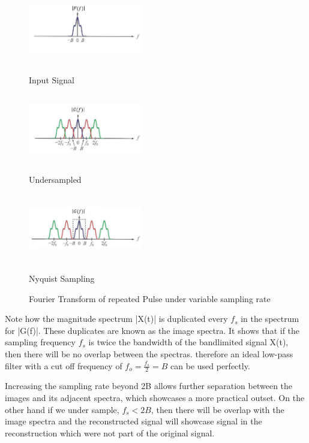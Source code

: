 \documentclass{article}
\begin{document}
\begin{figure}[!htb]
      \includegraphics[width=5cm, height=3cm]{figures/Orig_Sample_Singal_Single_Impulse.PNG}
      \caption{Input Signal}
    \endminipage\hfill
      \includegraphics[width=5cm, height=3cm]{figures/Undersampled.PNG}
      \caption{Undersampled}
    \endminipage\hfill
      \includegraphics[width=5cm, height=3cm]{figures/Orig_Nyquiest.PNG}
      \caption{Nyquist Sampling}
    \endminipage\hfill
    \caption{Fourier Transform of repeated Pulse under variable sampling rate}
    \label{fig:shannon}
\end{figure}

Note how the magnitude spectrum |X(t)| is duplicated every $ f_s $ in the spectrum for |G(f)|. These duplicates are known as the image spectra. It shows that if the sampling frequency $ f_s $ is twice the bandwidth of the bandlimited signal X(t), then there will be no overlap between the spectras. therefore an ideal low-pass filter with a cut off frequency of $ f_o = \frac{f_s}{2} = B $ can be used perfectly. 

Increasing the sampling rate beyond 2B allows further separation between the images and its adjacent spectra, which showcases a more practical outset. On the other hand if we under sample, $ f_s < 2B $, then there will be overlap with the image spectra and the reconstructed signal will showcase signal in the reconstruction which were not part of the original signal. 
\end{document}
